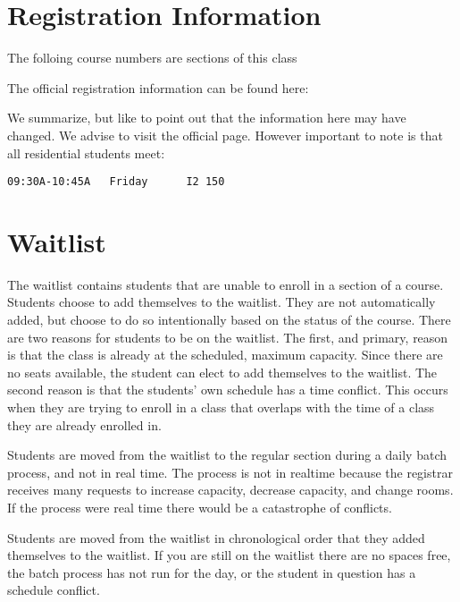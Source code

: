 \section{Registration Information}\label{registration-information}

The folloing course numbers are sections of this class

The official registration information can be found here:


We summarize, but like to point out that the information here may have
changed. We advise to visit the official page. However important to note
is that all residential students meet:

\begin{verbatim}
09:30A-10:45A   Friday      I2 150 
\end{verbatim}


\section{Waitlist}\label{waitlist}

The waitlist contains students that are unable to enroll in a section of
a course. Students choose to add themselves to the waitlist. They are
not automatically added, but choose to do so intentionally based on the
status of the course. There are two reasons for students to be on the
waitlist. The first, and primary, reason is that the class is already at
the scheduled, maximum capacity. Since there are no seats available, the
student can elect to add themselves to the waitlist. The second reason
is that the students' own schedule has a time conflict. This occurs when
they are trying to enroll in a class that overlaps with the time of a
class they are already enrolled in.

Students are moved from the waitlist to the regular section during a
daily batch process, and not in real time. The process is not in
realtime because the registrar receives many requests to increase
capacity, decrease capacity, and change rooms. If the process were real
time there would be a catastrophe of conflicts.

Students are moved from the waitlist in chronological order that they
added themselves to the waitlist. If you are still on the waitlist there
are no spaces free, the batch process has not run for the day, or the
student in question has a schedule conflict.

